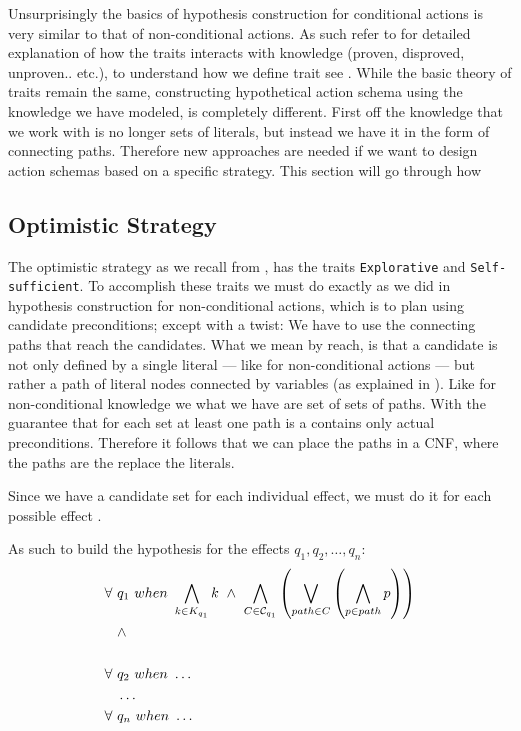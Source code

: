 \documentclass[\master/Master.tex]{subfiles}
\begin{document}
  	Unsurprisingly the basics of hypothesis construction for conditional actions is very similar to that of non-conditional actions. 
  	As such refer to  for detailed explanation of how the traits interacts with knowledge (proven, disproved, unproven.. etc.), to understand how we define trait see .
  	While the basic theory of traits remain the same, constructing hypothetical action schema using the knowledge we have modeled, is completely different. First off the knowledge that we work with is no longer sets of literals, but instead we have it in the form of connecting paths.
  	Therefore new approaches are needed if we want to design action schemas based on a specific strategy.
  	This section will go through how 
  	 	
  	\subsection{Optimistic Strategy}
  	The optimistic strategy as we recall from , has the traits \texttt{Explorative} and \texttt{Self-sufficient}.
  	To accomplish these traits we must do exactly as we did in hypothesis construction for non-conditional actions, 
  	which is to plan using candidate preconditions; except with a twist: 
  	We have to use the connecting paths that reach the candidates.
  	What we mean by reach, is that a candidate is not only defined by a single literal --- like for non-conditional actions --- but rather a path of literal nodes connected by variables (as explained in ). 
  	Like for non-conditional knowledge we what we have are set of sets of paths. With the guarantee that for each set at least one path is a contains only actual preconditions. Therefore it follows that we can place the paths in a CNF, where the paths are the replace the literals.
  	
  	Since we have a candidate set for each individual effect, we must do it for each possible effect \preds.
  	
  	As such to build the hypothesis for the effects $q_1,q_2,\dots,q_n$:  	
  	\begin{equation} \label{eq:ca:opt-preconds}
  	\begin{split}  	
  	\forall ~& q_1 ~ when ~ \bigwedge\limits_{k \in K_{q_1}} k ~ \land ~ 
  	\bigwedge \limits_{C \in \mathcal{C}_{q_1} } \left( \bigvee \limits_{path \in C} \left( \bigwedge \limits_{p \in path} p\right)\right)
  	\\
  	& \land \\
  	\\
  	\forall ~& q_2 ~ when ~  \dots \\
  	&\dots \\
  	\forall ~& q_n ~ when ~  \dots
  	\end{split}  	
  	\end{equation}
  	
\end{document}
